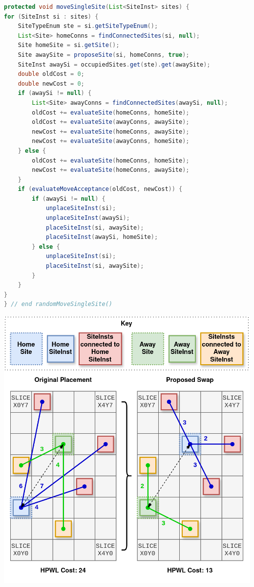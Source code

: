 \begin{lstlisting}[language=java, caption={Single Site Movement}, label={lst:sa_move_single}]
protected void moveSingleSite(List<SiteInst> sites) {
for (SiteInst si : sites) {
    SiteTypeEnum ste = si.getSiteTypeEnum();
    List<Site> homeConns = findConnectedSites(si, null);
    Site homeSite = si.getSite();
    Site awaySite = proposeSite(si, homeConns, true);
    SiteInst awaySi = occupiedSites.get(ste).get(awaySite);
    double oldCost = 0;
    double newCost = 0;
    if (awaySi != null) {
        List<Site> awayConns = findConnectedSites(awaySi, null);
        oldCost += evaluateSite(homeConns, homeSite);
        oldCost += evaluateSite(awayConns, awaySite);
        newCost += evaluateSite(homeConns, awaySite);
        newCost += evaluateSite(awayConns, homeSite);
    } else {
        oldCost += evaluateSite(homeConns, homeSite);
        newCost += evaluateSite(homeConns, awaySite);
    }
    if (evaluateMoveAcceptance(oldCost, newCost)) {
        if (awaySi != null) {
            unplaceSiteInst(si);
            unplaceSiteInst(awaySi);
            placeSiteInst(si, awaySite);
            placeSiteInst(awaySi, homeSite);
        } else {
            unplaceSiteInst(si);
            placeSiteInst(si, awaySite);
        }
    }
}
} // end randomMoveSingleSite()
\end{lstlisting}

{
    \centering
    \includegraphics[width=\columnwidth]{figures/placement/swapSingleSite.png}
    \label{fig:swapSingleSite}
}
\vfill

